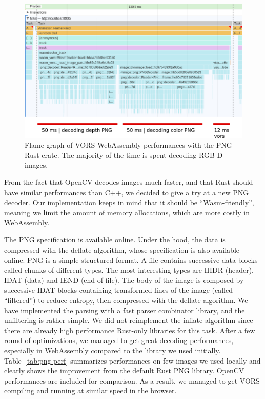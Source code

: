 \begin{figure}[ht]
	\centering
	\includegraphics[width=\linewidth]{assets/img/png-perf-profile-annotated.png}
	\caption{Flame graph of VORS WebAssembly performances with the PNG Rust crate.
	The majority of the time is spent decoding RGB-D images.}%
	\label{fig:png-perf}
\end{figure}

From the fact that OpenCV decodes images much faster,
and that Rust should have similar performances than C++,
we decided to give a try at a new PNG decoder.
Our implementation keeps in mind that it should be ``Wasm-friendly'',
meaning we limit the amount of memory allocations,
which are more costly in WebAssembly.

The PNG specification is available online.
Under the hood, the data is compressed with the deflate algorithm,
whose specification is also available online.
PNG is a simple structured format.
A file contains successive data blocks called chunks of different types.
The most interesting types are IHDR (header), IDAT (data) and IEND (end of file).
The body of the image is composed by successive IDAT blocks
containing transformed lines of the image (called ``filtered'') to reduce entropy,
then compressed with the deflate algorithm.
We have implemented the parsing with a fast parser combinator library,
and the unfiltering is rather simple.
We did not reimplement the inflate algorithm
since there are already high performance Rust-only libraries for this task.
After a few round of optimizations,
we managed to get great decoding performances,
especially in WebAssembly compared to the library we used initially.
Table~\ref{tab:png-perf} summarizes performances on few images we used locally
and clearly shows the improvement from the default Rust PNG library.
OpenCV performances are included for comparison.
As a result, we managed to get VORS compiling and running at similar speed in the browser.

